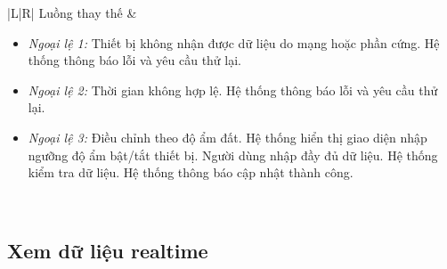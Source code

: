 \begin{longtable}{|L|R|}
Luồng thay thế &
\begin{itemize}[leftmargin=*, nosep, topsep=2pt]
  \item \textit{Ngoại lệ 1:} Thiết bị không nhận được dữ liệu do mạng hoặc phần cứng. Hệ thống thông báo lỗi và yêu cầu thử lại.
  \item \textit{Ngoại lệ 2:} Thời gian không hợp lệ. Hệ thống thông báo lỗi và yêu cầu thử lại.
  \item \textit{Ngoại lệ 3:} Điều chỉnh theo độ ẩm đất. Hệ thống hiển thị giao diện nhập ngưỡng độ ẩm bật/tắt thiết bị. Người dùng nhập đầy đủ dữ liệu. Hệ thống kiểm tra dữ liệu. Hệ thống thông báo cập nhật thành công.
\end{itemize} \\[4pt] \hline
 
\end{longtable}

\subsection{Xem dữ liệu realtime}
 
